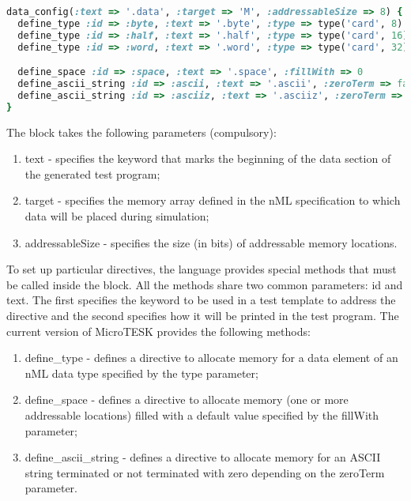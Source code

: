 \documentclass[oneside,final,14pt]{extreport}
\begin{document}
{\begin{lstlisting}[language=ruby]
data_config(:text => '.data', :target => 'M', :addressableSize => 8) {
  define_type :id => :byte, :text => '.byte', :type => type('card', 8)
  define_type :id => :half, :text => '.half', :type => type('card', 16)
  define_type :id => :word, :text => '.word', :type => type('card', 32)

  define_space :id => :space, :text => '.space', :fillWith => 0
  define_ascii_string :id => :ascii, :text => '.ascii', :zeroTerm => false
  define_ascii_string :id => :asciiz, :text => '.asciiz', :zeroTerm => true
}
\end{lstlisting}

The block takes the following parameters (compulsory):

\begin{enumerate}
  \item text - specifies the keyword that marks the beginning of the data section
        of the generated test program;

  \item target - specifies the memory array defined in the nML specification to
        which data will be placed during simulation;

  \item addressableSize - specifies the size (in bits) of addressable memory locations.
\end{enumerate}

To set up particular directives, the language provides special methods that must
be called inside the block. All the methods share two common parameters: id and text.
The first specifies the keyword to be used in a test template to address the
directive and the second specifies how it will be printed in the test program. The
current version of MicroTESK provides the following methods:

\begin{enumerate}
  \item define{\_}type - defines a directive to allocate memory for a data element
        of an nML data type specified by the type parameter;

  \item define{\_}space - defines a directive to allocate memory (one or more
        addressable locations) filled with a default value specified by the
        fillWith parameter;

  \item define{\_}ascii{\_}string - defines a directive to allocate memory for an
        ASCII string terminated or not terminated with zero depending on the
        zeroTerm parameter.
\end{enumerate}

}
\end{document}
